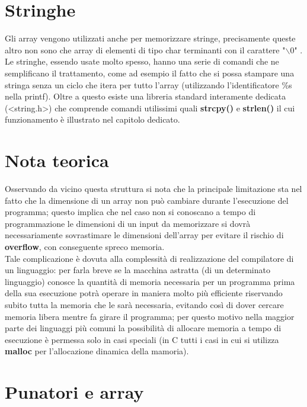 \section{Stringhe}
Gli array vengono utilizzati anche per memorizzare stringe, precisamente queste altro non sono che array di elementi di tipo char terminanti con il carattere "$\backslash0$" . Le stringhe, essendo usate molto spesso, hanno una serie di comandi che ne semplificano il trattamento, come ad esempio il fatto che si possa stampare una stringa senza un ciclo che itera per tutto l'array (utilizzando l'identificatore \%s nella printf). Oltre a questo esiste una libreria standard interamente dedicata (<string.h>) che comprende comandi utilissimi quali \textbf{strcpy()} e \textbf{strlen()} il cui funzionamento è illustrato nel capitolo dedicato.

\section{Nota teorica}
Osservando da vicino questa struttura si nota che la principale limitazione sta nel fatto che la dimensione di un array non può cambiare durante l'esecuzione del programma; questo implica che nel caso non si conoscano a tempo di programmazione le dimensioni di un input da memorizzare si dovrà necessariamente sovrastimare le dimensioni dell'array per evitare il rischio di \textbf{overflow}, con conseguente spreco memoria.\\ 
Tale complicazione è dovuta alla complessità di realizzazione del compilatore di un linguaggio: per farla breve se la macchina astratta (di un determinato linguaggio) conosce la quantità di memoria necessaria per un programma prima della sua esecuzione 
potrà operare in maniera molto più efficiente riservando subito tutta la memoria che le sarà necessaria, evitando così di dover cercare memoria libera mentre fa girare il programma; per questo motivo nella maggior parte dei linguaggi più comuni la possibilità di allocare memoria a tempo di esecuzione è permessa solo in casi speciali (in C tutti i casi in cui si utilizza \textbf{malloc} per l'allocazione dinamica della mamoria).\\

\section{Punatori e array}

